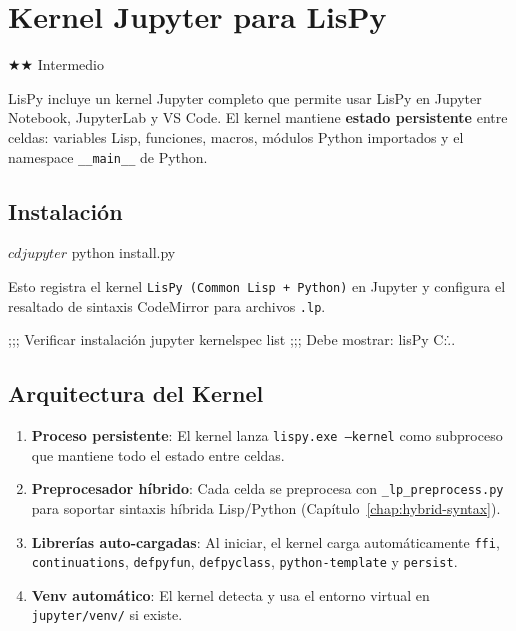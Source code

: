 \chapter{Kernel Jupyter para LisPy}
\label{chap:jupyter}
{\huge$\bigstar$}{\huge$\bigstar$} Intermedio

LisPy incluye un kernel Jupyter completo que permite usar LisPy en Jupyter Notebook,
JupyterLab y VS Code. El kernel mantiene \textbf{estado persistente} entre celdas:
variables Lisp, funciones, macros, módulos Python importados y el namespace
\texttt{\_\_main\_\_} de Python.

\section{Instalación}

\begin{lispcode}
$ cd jupyter
$ python install.py
\end{lispcode}

Esto registra el kernel \texttt{LisPy (Common Lisp + Python)} en Jupyter y configura
el resaltado de sintaxis CodeMirror para archivos \texttt{.lp}.

\begin{lispcode}
;;; Verificar instalación
jupyter kernelspec list
;;; Debe mostrar: lisPy    C:\Users\...\jupyter{}\lisPy
\end{lispcode}

\section{Arquitectura del Kernel}

\begin{enumerate}
\item \textbf{Proceso persistente}: El kernel lanza \texttt{lispy.exe --kernel}
      como subproceso que mantiene todo el estado entre celdas.
\item \textbf{Preprocesador híbrido}: Cada celda se preprocesa con
      \texttt{\_lp\_preprocess.py} para soportar sintaxis híbrida
      Lisp/Python (Capítulo~\ref{chap:hybrid-syntax}).
\item \textbf{Librerías auto-cargadas}: Al iniciar, el kernel carga automáticamente
      \texttt{ffi}, \texttt{continuations}, \texttt{defpyfun}, \texttt{defpyclass},
      \texttt{python-template} y \texttt{persist}.
\item \textbf{Venv automático}: El kernel detecta y usa el entorno virtual
      en \texttt{jupyter/venv/} si existe.
\end{enumerate}

